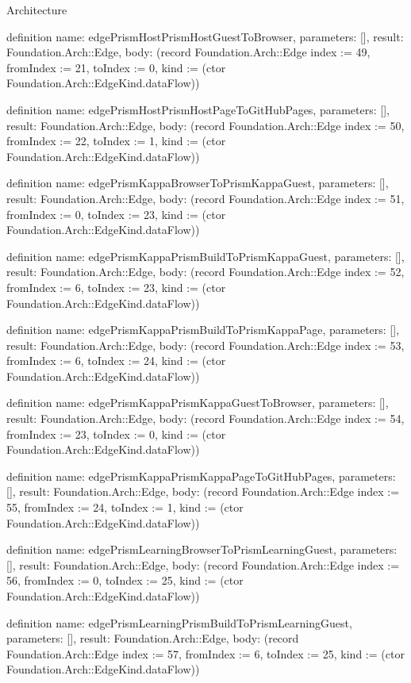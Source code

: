 \begin{lexlean}{Architecture}
\begin{semanticmodule}
definition{
  name: edgePrismHostPrismHostGuestToBrowser,
  parameters: [],
  result: Foundation.Arch::Edge,
  body: (record Foundation.Arch::Edge {index := 49, fromIndex := 21, toIndex := 0, kind := (ctor Foundation.Arch::EdgeKind.dataFlow)})
}

definition{
  name: edgePrismHostPrismHostPageToGitHubPages,
  parameters: [],
  result: Foundation.Arch::Edge,
  body: (record Foundation.Arch::Edge {index := 50, fromIndex := 22, toIndex := 1, kind := (ctor Foundation.Arch::EdgeKind.dataFlow)})
}

definition{
  name: edgePrismKappaBrowserToPrismKappaGuest,
  parameters: [],
  result: Foundation.Arch::Edge,
  body: (record Foundation.Arch::Edge {index := 51, fromIndex := 0, toIndex := 23, kind := (ctor Foundation.Arch::EdgeKind.dataFlow)})
}

definition{
  name: edgePrismKappaPrismBuildToPrismKappaGuest,
  parameters: [],
  result: Foundation.Arch::Edge,
  body: (record Foundation.Arch::Edge {index := 52, fromIndex := 6, toIndex := 23, kind := (ctor Foundation.Arch::EdgeKind.dataFlow)})
}

definition{
  name: edgePrismKappaPrismBuildToPrismKappaPage,
  parameters: [],
  result: Foundation.Arch::Edge,
  body: (record Foundation.Arch::Edge {index := 53, fromIndex := 6, toIndex := 24, kind := (ctor Foundation.Arch::EdgeKind.dataFlow)})
}

definition{
  name: edgePrismKappaPrismKappaGuestToBrowser,
  parameters: [],
  result: Foundation.Arch::Edge,
  body: (record Foundation.Arch::Edge {index := 54, fromIndex := 23, toIndex := 0, kind := (ctor Foundation.Arch::EdgeKind.dataFlow)})
}

definition{
  name: edgePrismKappaPrismKappaPageToGitHubPages,
  parameters: [],
  result: Foundation.Arch::Edge,
  body: (record Foundation.Arch::Edge {index := 55, fromIndex := 24, toIndex := 1, kind := (ctor Foundation.Arch::EdgeKind.dataFlow)})
}

definition{
  name: edgePrismLearningBrowserToPrismLearningGuest,
  parameters: [],
  result: Foundation.Arch::Edge,
  body: (record Foundation.Arch::Edge {index := 56, fromIndex := 0, toIndex := 25, kind := (ctor Foundation.Arch::EdgeKind.dataFlow)})
}

definition{
  name: edgePrismLearningPrismBuildToPrismLearningGuest,
  parameters: [],
  result: Foundation.Arch::Edge,
  body: (record Foundation.Arch::Edge {index := 57, fromIndex := 6, toIndex := 25, kind := (ctor Foundation.Arch::EdgeKind.dataFlow)})
}


\end{semanticmodule}
\end{lexlean}
